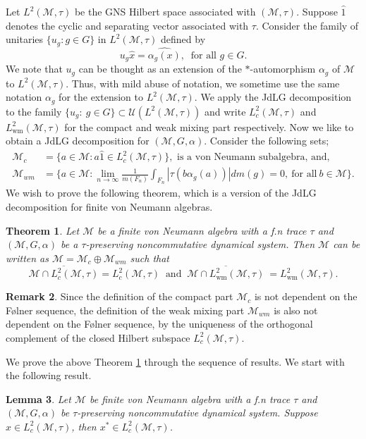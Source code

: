 \documentclass[11pt]{amsart}
\newtheorem{thm}{Theorem}[section]
\newtheorem{lem}[thm]{Lemma}
\theoremstyle{definition}
\theoremstyle{myremark}
\newtheorem{rem}[thm]{Remark}
\numberwithin{equation}{section}
\newcommand{\CM}{\mathcal{M}}
\newcommand{\CU}{\mathcal{U}}
\newcommand{\abs}[1]{\left\vert#1\right\vert}
\begin{document}
Let $L^2(\CM,\tau)$ be  the GNS Hilbert space associated with $(\CM,\tau)$. 
Suppose $\widehat{1}$ denotes the cyclic and separating vector associated with $\tau.$
Consider the family of unitaries  $ \{ u_g : g \in G \}$ in $ L^2(\CM, \tau)$ defined by 
$$ u_g \widehat{ x } = \widehat{\alpha_g(x)}, ~\text{ for all } g \in G.$$
We note that $u_g$ can be thought as an extension of  the $*$-automorphism $\alpha_g$ of $\CM$ to $ L^2(\CM, \tau)$. Thus, with mild abuse of notation, we sometime use the same notation $ \alpha_g$ for the extension to $L^2(\CM, \tau)$.
We apply the JdLG decomposition  to the family $ \{ u_g: ~g \in G\} \subset \CU(L^{2}(\CM, \tau))$ and write $ L^2_c(\CM, \tau)$  and $L^2_{ \text{wm} }(\CM, \tau)$ for the compact and weak mixing part respectively. Now we like to obtain a JdLG decomposition for 
 $ (\CM,  G, \alpha)$. Consider the following sets;
\begin{align*}
    \CM_{c} &= \{a \in \CM:a \widehat{1}\in L^{2}_{c}(\CM, \tau)\}, \text{ is a von Neumann subalgebra, and,}\\
\CM_{wm}&=\biggl\{a \in \CM:\lim_{n \rightarrow \infty}\frac{1}{m(F_{n})}\int_{F_{n}}\abs{\tau(b\alpha_{g}(a))}dm(g)=0,~\text{for all}~ b\in \CM \biggr\}.
\end{align*}
We wish to prove the following theorem, which is a version of the JdLG decomposition for finite von Neumann algebras. 
\begin{thm}\label{JdLG}
Let $ \CM$ be a finite von Neumann algebra with a f.n trace $\tau$ and $ (\CM, G, \alpha) $ be a $\tau$-preserving noncommutative dynamical system. Then $\CM$ can be written as 
$\CM=\CM_{c}\oplus \CM_{wm}$ such that 
\[ \overline{ \CM \cap L^{2}_{c}(\CM,\tau)} = L_{c}^{2}(\CM,\tau)    ~\text{ and }~  \overline{ \CM \cap L^{2}_{\text{wm}}(\CM,\tau) } ~=  L^{2}_{\text{wm}}(\CM,\tau) .\]
\end{thm}
\begin{rem}
Since the definition of the compact part $\CM_{c}$ is not dependent on the F{\o}lner sequence, the definition of the weak mixing part $\CM_{wm}$ is also not dependent on the F{\o}lner sequence, by the uniqueness of the orthogonal complement of the closed Hilbert subspace $L_{c}^{2}(\CM, \tau)$.
\end{rem}
We prove the above Theorem \ref{JdLG} through the sequence of results.  We start with the following result.
\begin{lem}\label{xstarcpt} 
Let $\CM$ be finite von Neumann algebra with a f.n trace $\tau$ and $ (\CM, G, \alpha)$ be $\tau$-preserving noncommutative dynamical system. Suppose  
 $x \in L^{2}_{c}(\CM, \tau)$, then $x^{*}\in L^{2}_{c}(\CM, \tau)$.
\end{lem}
\end{document}
